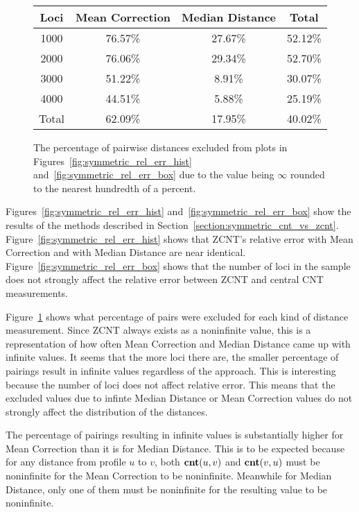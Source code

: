 \begin{figure}[ht]
    \centering 
    \begin{tabular}{|c|c|c|c|} \hline
        Loci & Mean Correction & Median Distance & Total \\ \hline \hline
        1000 & 76.57\% & 27.67\% & 52.12\% \\ 
        2000 & 76.06\% & 29.34\% & 52.70\% \\ 
        3000 & 51.22\% & 8.91\% & 30.07\% \\ 
        4000 & 44.51\% & 5.88\% & 25.19\% \\ \hline
        Total & 62.09\% & 17.95\% & 40.02\% \\ \hline
    \end{tabular}
    \caption{The percentage of pairwise distances excluded from plots in Figures~\ref{fig:symmetric_rel_err_hist} and~\ref{fig:symmetric_rel_err_box} due to the value being $\infty$ rounded to the nearest hundredth of a percent.}\label{fig:excluded_table}
\end{figure}
    
Figures~\ref{fig:symmetric_rel_err_hist} and~\ref{fig:symmetric_rel_err_box} show the results of the methods described in Section~\ref{section:symmetric_cnt_vs_zcnt}. Figure~\ref{fig:symmetric_rel_err_hist} shows that ZCNT's relative error with Mean Correction and with Median Distance are near identical. Figure~\ref{fig:symmetric_rel_err_box} shows that the number of loci in the sample does not strongly affect the relative error between ZCNT and central CNT measurements. 

Figure~\ref{fig:excluded_table} shows what percentage of pairs were excluded for each kind of distance measurement. Since ZCNT always exists as a noninfinite value, this is a representation of how often Mean Correction and Median Distance came up with infinite values. It seems that the more loci there are, the smaller percentage of pairings result in infinite values regardless of the approach. This is interesting because the number of loci does not affect relative error. This means that the excluded values due to infinte Median Distance or Mean Correction values do not strongly affect the distribution of the distances.

The percentage of pairings resulting in infinite values is substantially higher for Mean Correction than it is for Median Distance. This is to be expected because for any distance from profile $u$ to $v$, both $\textbf{cnt}(u, v)$ and $\textbf{cnt}(v, u)$ must be noninfinite for the Mean Correction to be noninfinite. Meanwhile for Median Distance, only one of them must be noninfinite for the resulting value to be noninfinite.